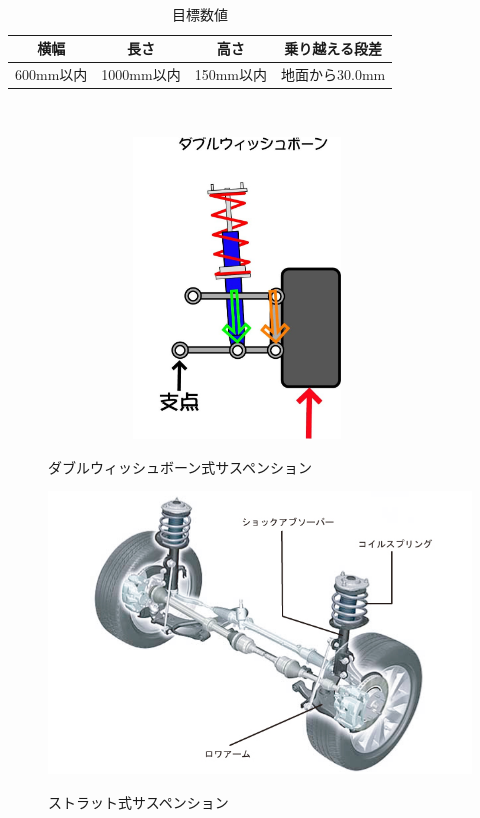 \documentclass[11pt]{jsarticle}
\begin{document}
\begin{table}[htb]
 　\begin{center}
    \caption{目標数値}
  \begin{tabular}{|c|c|c||c|} \hline
    横幅 & 長さ & 高さ & 乗り越える段差 \\ \hline \hline
    600mm以内 & 1000mm以内 & 150mm以内 & 地面から30.0mm \\ \hline
  \end{tabular}
　   \label{tab:joken}
  \end{center}
\end{table}


\begin{figure}[htbt]
 \begin{center}
  \includegraphics[height=80mm,width=100mm]{img/doublewish.jpg}
 　\caption{ダブルウィッシュボーン式サスペンション}
  \label{fig:doublewish}%
 \end{center}
\end{figure}

\begin{figure}[htbt]
 \begin{center}
  \includegraphics[width=120mm]{img/strat.jpg}
 　\caption{ストラット式サスペンション}
  \label{fig:strat}%
 \end{center}
\end{figure}
\end{document}
